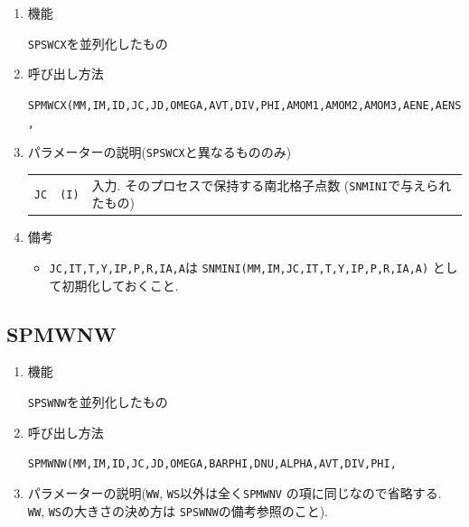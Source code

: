 \begin{enumerate}

\item 機能

{\tt SPSWCX}を並列化したもの

\item 呼び出し方法 

{\tt SPMWCX(MM,IM,ID,JC,JD,OMEGA,AVT,DIV,PHI,AMOM1,AMOM2,AMOM3,AENE,AENS,}\\
\hspace*{10em}{\tt RN,IT,T,Y,IP,P,R,IA,A,Q,WS,WW)}
  
\item パラメーターの説明({\tt SPSWCX}と異なるもののみ)

\begin{tabular}{lll}
{\tt JC} & {\tt (I)} & 入力. そのプロセスで保持する南北格子点数
                        ({\tt SNMINI}で与えられたもの)\\
\end{tabular}

\item 備考

\begin{itemize}

\item {\tt JC,IT,T,Y,IP,P,R,IA,A}は 
      {\tt SNMINI(MM,IM,JC,IT,T,Y,IP,P,R,IA,A)} として初期化しておくこと.\\

 \end{itemize}

\end{enumerate}


\subsection{SPMWNW}

\begin{enumerate}

\item 機能

{\tt SPSWNW}を並列化したもの

\item 呼び出し方法 

{\tt SPMWNW(MM,IM,ID,JC,JD,OMEGA,BARPHI,DNU,ALPHA,AVT,DIV,PHI,}\\
\hspace*{10em}{\tt DAVT,DDIV,DPHI,RN,IRM,IT,T,Y,IP,P,R,IA,A,Q,WS,WW,W)}

\item パラメーターの説明({\tt WW}, {\tt WS}以外は全く{\tt SPMWNV}
の項に同じなので省略する. {\tt WW}, {\tt WS}の大きさの決め方は
{\tt SPSWNW}の備考参照のこと).

\end{enumerate}

